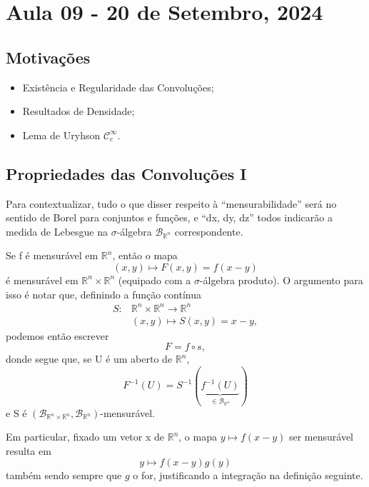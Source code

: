 \documentclass[../distribution_theory_notes.tex]{subfiles}
\begin{document}
\section{Aula 09 - 20 de Setembro, 2024}
\subsection{Motivações}
\begin{itemize}
	\item Existência e Regularidade das Convoluções;
	\item Resultados de Densidade;
	\item Lema de Uryhson \(\mathcal{C}_{c}^{\infty}\).
\end{itemize}
\subsection{Propriedades das Convoluções I}
Para contextualizar, tudo o que disser respeito à ``mensurabilidade'' será no sentido de Borel para conjuntos e funções, e ``dx, dy, dz'' todos indicarão a medida de Lebesgue na \(\sigma \)-álgebra \(\mathcal{B}_{\mathbb{R}^{n}}\) correspondente.
\begin{tcolorbox}[
		skin=enhanced,
		title=Observação,
		fonttitle=\bfseries,
		colframe=black,
		colbacktitle=cyan!75!white,
		colback=cyan!15,
		colbacklower=black,
		coltitle=black,
		drop fuzzy shadow,
	]
	Se f é mensurável em \(\mathbb{R}^{n}\), então o mapa
	\[
		(x, y)\mapsto F(x, y)=f(x-y)
	\]
	é mensurável em \(\mathbb{R}^{n}\times \mathbb{R}^{n}\) (equipado com a \(\sigma \)-álgebra produto). O argumento para isso é notar que, definindo a função contínua
	\begin{align*}
		S: & \mathbb{R}^{n}\times \mathbb{R}^{n}\rightarrow \mathbb{R}^{n} \\
		   & (x, y)\mapsto S(x, y)=x-y,
	\end{align*}
	podemos então escrever
	\[
		F = f\circ s,
	\]
	donde segue que, se U é um aberto de \(\mathbb{R}^{n}\),
	\[
		F^{-1}(U)=S^{-1}(\underbrace{f^{-1}(U)}_{\in \mathcal{B}_{\mathbb{R}^{n}}})
	\]
	e S é \((\mathcal{B}_{\mathbb{R}^{n}\times \mathbb{R}^{n}}, \mathcal{B}_{\mathbb{R}^{n}})\)-mensurável.

	Em particular, fixado um vetor x de \(\mathbb{R}^{n}\), o mapa \(y\mapsto f(x-y)\) ser mensurável resulta em
	\[
		y\mapsto f(x-y)g(y)
	\]
	também sendo sempre que \(g\) o for, justificando a integração na definição seguinte.
\end{tcolorbox}
\end{document}
